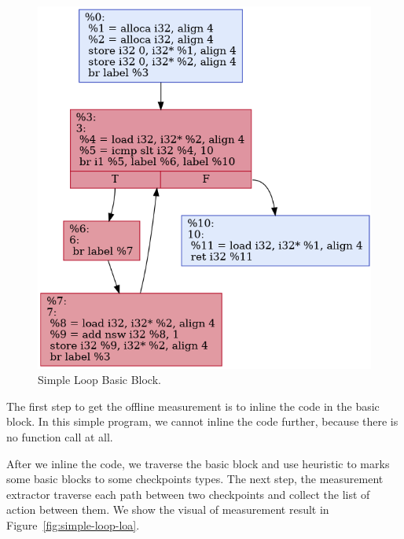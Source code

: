 \begin{figure}[t]
    \centerline{\includegraphics[scale=.70]{Figures/05/simple-loop.png}}
    \caption{Simple Loop Basic Block.} 
    \label{fig:simple-loop-bb}
\end{figure}

The first step to get the offline measurement is to inline the code in the basic
block. In this simple program, we cannot inline the code further, because there
is no function call at all. 

After we inline the code, we traverse the basic block and use heuristic to
marks some basic blocks to some checkpoints types. The next step, the
measurement extractor traverse each path between two checkpoints and collect the
list of action between them. We show the visual of measurement result in
Figure~\ref{fig:simple-loop-loa}.

